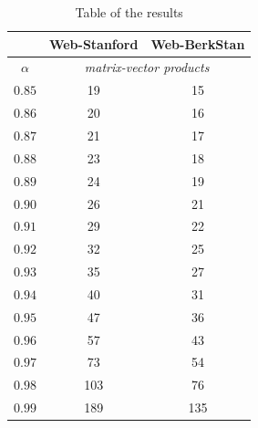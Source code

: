 \begin{table}[h]
    \centering
    \begin{tabular}{|c|cc|}
        \hline
        \textbf{} & \multicolumn{1}{c|}{\textbf{Web-Stanford}} & \textbf{Web-BerkStan} \\ \hline
        $\alpha$  & \multicolumn{2}{c|}{\textit{matrix-vector products}}                                   \\ \hline
        $0.85$         & \multicolumn{1}{c|}{19}                     & 15                     \\ \hline
        $0.86$         & \multicolumn{1}{c|}{20}                     & 16                     \\ \hline
        $0.87$         & \multicolumn{1}{c|}{21}                     & 17                     \\ \hline
        $0.88$         & \multicolumn{1}{c|}{23}                     & 18                     \\ \hline
        $0.89$         & \multicolumn{1}{c|}{24}                     & 19                     \\ \hline
    $0.90$         & \multicolumn{1}{c|}{26}                     & 21                     \\ \hline
    $0.91$         & \multicolumn{1}{c|}{29}                     & 22                     \\ \hline
    $0.92$         & \multicolumn{1}{c|}{32}                     & 25                     \\ \hline
    $0.93$         & \multicolumn{1}{c|}{35}                     & 27                     \\ \hline
    $0.94$         & \multicolumn{1}{c|}{40}                     & 31                     \\ \hline
    $0.95$         & \multicolumn{1}{c|}{47}                     & 36                     \\ \hline
    $0.96$         & \multicolumn{1}{c|}{57}                     & 43                     \\ \hline
    $0.97$         & \multicolumn{1}{c|}{73}                     & 54                     \\ \hline
    $0.98$         & \multicolumn{1}{c|}{103}                    & 76                     \\ \hline
    $0.99$         & \multicolumn{1}{c|}{189}                    & 135                    \\ \hline
\end{tabular}
\caption{Table of the results}
\label{tab:mv}
\end{table}


